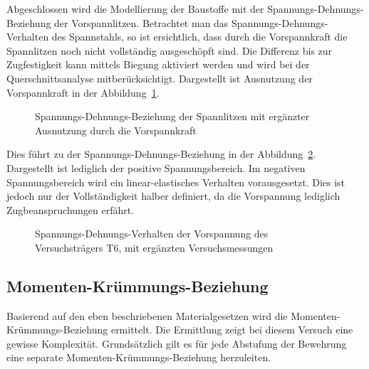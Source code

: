 \documentclass[
  11pt,
  letterpaper,
]{scrreprt}
\begin{document}
Abgeschlossen wird die Modellierung der Baustoffe mit der
Spannungs-Dehnungs-Beziehung der Vorspannlitzen. Betrachtet man das
Spannungs-Dehnungs-Verhalten des Spannstahls, so ist ersichtlich, dass
durch die Vorspannkraft die Spannlitzen noch nicht vollständig
ausgeschöpft sind. Die Differenz bis zur Zugfestigkeit kann mittels
Biegung aktiviert werden und wird bei der Querschnittsanalyse
mitberücksichtigt. Dargestellt ist Ausnutzung der Vorspannkraft in der
Abbildung~\ref{fig-ausnutzung_sigma_p}.

\begin{figure}[H]


\caption{\label{fig-ausnutzung_sigma_p}Spannungs-Dehnungs-Beziehung der
Spannlitzen mit ergänzter Ausnutzung durch die Vorspannkraft}

\end{figure}%

Dies führt zu der Spannungs-Dehnungs-Beziehung in der
Abbildung~\ref{fig-sigma_eps_vorspannung_t6}. Dargestellt ist lediglich
der positive Spannungsbereich. Im negativen Spannungsbereich wird ein
linear-elastisches Verhalten vorausgesetzt. Dies ist jedoch nur der
Vollständigkeit halber definiert, da die Vorspannung lediglich
Zugbeanspruchungen erfährt.

\begin{figure}[H]


\caption{\label{fig-sigma_eps_vorspannung_t6}Spannungs-Dehnungs-Verhalten
der Vorspannung des Versuchsträgers T6, mit ergänzten Versuchsmessungen}

\end{figure}%

\subsection{Momenten-Krümmungs-Beziehung}\label{momenten-kruxfcmmungs-beziehung}

Basierend auf den eben beschriebenen Materialgesetzen wird die
Momenten-Krümmungs-Beziehung ermittelt. Die Ermittlung zeigt bei diesem
Versuch eine gewisse Komplexität. Grundsätzlich gilt es für jede
Abstufung der Bewehrung eine separate Momenten-Krümmungs-Beziehung
herzuleiten.
\end{document}
